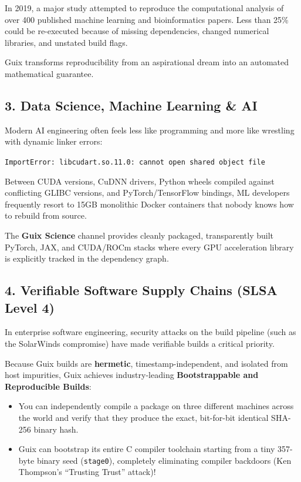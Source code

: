 \begin{tearsbox}
In 2019, a major study attempted to reproduce the computational analysis of over 400 published machine learning and bioinformatics papers. Less than 25\% could be re-executed because of missing dependencies, changed numerical libraries, and unstated build flags.

Guix transforms reproducibility from an aspirational dream into an automated mathematical guarantee.
\end{tearsbox}

\subsection{3. Data Science, Machine Learning \& AI}

Modern AI engineering often feels less like programming and more like wrestling with dynamic linker errors:
\begin{center}
\texttt{ImportError: libcudart.so.11.0: cannot open shared object file}
\end{center}

Between CUDA versions, CuDNN drivers, Python wheels compiled against conflicting GLIBC versions, and PyTorch/TensorFlow bindings, ML developers frequently resort to 15GB monolithic Docker containers that nobody knows how to rebuild from source.

The \textbf{Guix Science} channel provides cleanly packaged, transparently built PyTorch, JAX, and CUDA/ROCm stacks where every GPU acceleration library is explicitly tracked in the dependency graph.

\subsection{4. Verifiable Software Supply Chains (SLSA Level 4)}

In enterprise software engineering, security attacks on the build pipeline (such as the SolarWinds compromise) have made verifiable builds a critical priority.

Because Guix builds are \textbf{hermetic}, timestamp-independent, and isolated from host impurities, Guix achieves industry-leading \textbf{Bootstrappable and Reproducible Builds}:
\begin{itemize}
  \item You can independently compile a package on three different machines across the world and verify that they produce the exact, bit-for-bit identical SHA-256 binary hash.
  \item Guix can bootstrap its entire C compiler toolchain starting from a tiny 357-byte binary seed (\texttt{stage0}), completely eliminating compiler backdoors (Ken Thompson's ``Trusting Trust'' attack)!
\end{itemize}

